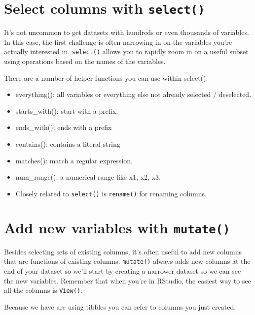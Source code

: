 \documentclass[]{book}
\providecommand{\tightlist}{%
  \setlength{\itemsep}{0pt}\setlength{\parskip}{0pt}}
\newenvironment{rmdblock}[1]
  {\begin{shaded*}
  \begin{itemize}
  \renewcommand{\labelitemi}{
    \raisebox{-.7\height}[0pt][0pt]{
      {\setkeys{Gin}{width=3em,keepaspectratio}\texttt{[image: images/\#1]}}
    }
  }
  \item
  }
  {
  \end{itemize}
  \end{shaded*}
  }
\newenvironment{rmdnote}
  {\begin{rmdblock}{note}}
  {\end{rmdblock}}
\theoremstyle{definition}
\theoremstyle{definition}
\theoremstyle{definition}
\theoremstyle{remark}
\begin{document}
\hypertarget{select-columns-with-select}{%
\section{\texorpdfstring{Select columns with
\texttt{select()}}{Select columns with select()}}\label{select-columns-with-select}}

It's not uncommon to get datasets with hundreds or even thousands of
variables. In this case, the first challenge is often narrowing in on
the variables you're actually interested in. \texttt{select()} allows
you to rapidly zoom in on a useful subset using operations based on the
names of the variables.

There are a number of helper functions you can use within select():

\begin{itemize}
\tightlist
\item
  everything(): all variables or everything else not already selected /
  deselected.
\item
  starts\_with(): start with a prefix.
\item
  ends\_with(): ends with a prefix
\item
  contains(): contains a literal string
\item
  matches(): match a regular expression.
\item
  num\_range(): a numerical range like x1, x2, x3. 
\end{itemize}

\begin{rmdnote}
Closely related to \texttt{select()} is \texttt{rename()} for renaming
columns.
\end{rmdnote}

\hypertarget{add-new-variables-with-mutate}{%
\section{\texorpdfstring{Add new variables with
\texttt{mutate()}}{Add new variables with mutate()}}\label{add-new-variables-with-mutate}}

Besides selecting sets of existing columns, it's often useful to add new
columns that are functions of existing columns. \texttt{mutate()} always
adds new columns at the end of your dataset so we'll start by creating a
narrower dataset so we can see the new variables. Remember that when
you're in RStudio, the easiest way to see all the columns is
\texttt{View()}.

Because we have are using tibbles you can refer to columns you just
created.
\end{document}
